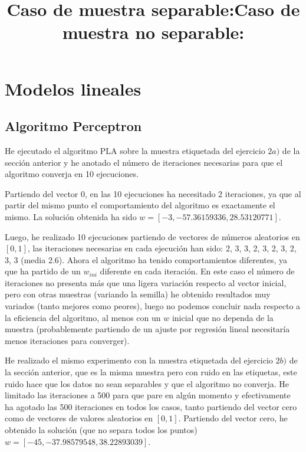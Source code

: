 \documentclass[a4]{article}
\begin{document}
\section{Modelos lineales}

\subsection{Algoritmo Perceptron}

\title{\bf \large Caso de muestra separable:}

He ejecutado el algoritmo PLA sobre la muestra etiquetada del 
ejercicio $2a)$ de la sección anterior y he anotado el número de
iteraciones necesarias para que el algoritmo converja en 10
ejecuciones.

Partiendo del vector 0, en las 10 ejecuciones ha necesitado 2
iteraciones, ya que al partir del mismo punto el comportamiento del
algoritmo es exactamente el mismo. La solución obtenida ha sido
$w=[-3,-57.36159336,28.53120771]$.

Luego, he realizado 10 ejecuciones partiendo de vectores de números
aleatorios en $[0,1]$, las iteraciones necesarias en cada ejecución
han sido: 2, 3, 3, 2, 3, 2, 3, 2, 3, 3 (media 2.6). Ahora el algoritmo
ha tenido comportamientos diferentes, ya que ha partido de un $w_{ini}$
diferente en cada iteración.
En este caso el número de iteraciones no presenta más que una ligera
variación respecto al vector inicial, pero con otras muestras (variando la
semilla) he obtenido resultados muy variados (tanto mejores como peores),
luego no podemos concluir nada respecto a la eficiencia del algoritmo, al menos con un $w$
inicial que no dependa de la muestra (probablemente partiendo de un ajuste por
regresión lineal necesitaría menos iteraciones para converger).

\title{\bf \large Caso de muestra no separable:}

He realizado el mismo experimento con la muestra etiquetada del
ejercicio $2b)$ de la sección anterior, que es la misma muestra pero
con ruido en las etiquetas, este ruido hace que los datos no sean 
separables y que el algoritmo no converja. He limitado las iteraciones
a 500 para que pare en algún momento y efectivamente ha agotado las
500 iteraciones en todos los casos, tanto partiendo del vector cero
como de vectores de valores aleatorios en $[0,1]$. Partiendo del 
vector cero, he obtenido la solución (que no separa todos los puntos) $w=[-45,-37.98579548,38.22893039]$.
\end{document}
